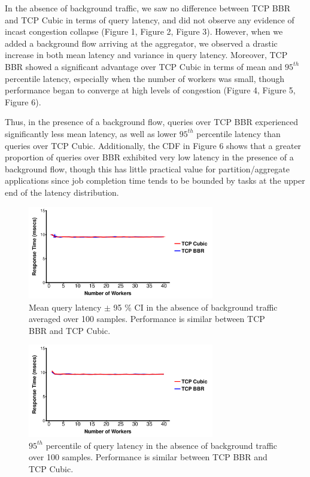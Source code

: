 \documentclass[letterpaper,twocolumn,10pt]{article}
\begin{document}
In the absence of background traffic, we saw no difference between TCP BBR and TCP Cubic in terms of query latency, and did not observe any evidence of incast congestion collapse (Figure 1, Figure 2, Figure 3). However, when we added a background flow arriving at the aggregator, we observed a drastic increase in both mean latency and variance in query latency. Moreover, TCP BBR showed a significant advantage over TCP Cubic in terms of mean and $95^{th}$ percentile latency, especially when the number of workers was small, though performance began to converge at high levels of congestion (Figure 4, Figure 5, Figure 6). 

Thus, in the presence of a background flow, queries over TCP BBR experienced significantly less mean latency, as well as lower $95^{th}$ percentile latency than queries over TCP Cubic. Additionally, the CDF in Figure 6 shows that a greater proportion of queries over BBR exhibited very low latency in the presence of a background flow, though this has little practical value for partition/aggregate applications since job completion time tends to be bounded by tasks at the upper end of the latency distribution.

\begin{figure}
\includegraphics[height=1.6in,width=3.2in]{plots/query_avg.pdf}
\caption{Mean query latency $\pm$ 95 \% CI in the absence of background traffic averaged over 100 samples. Performance is similar between TCP BBR and TCP Cubic.}
\end{figure}

\begin{figure}
\includegraphics[height=1.6in,width=3.2in]{plots/query_percentile.pdf}
\caption{$95^{th}$ percentile of query latency in the absence of background traffic over 100 samples. Performance is similar between TCP BBR and TCP Cubic.}
\end{figure}
\end{document}
